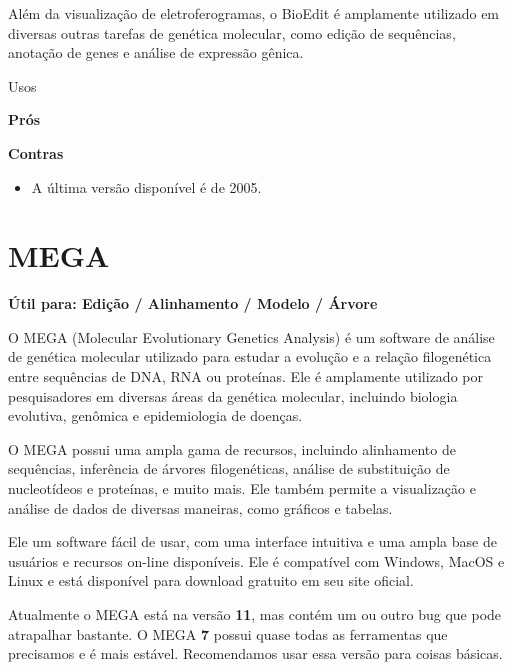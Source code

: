 \documentclass[
  letterpaper,
  DIV=11,
  numbers=noendperiod]{scrreprt}
\providecommand{\tightlist}{%
  \setlength{\itemsep}{0pt}\setlength{\parskip}{0pt}}\usepackage{longtable,booktabs,array}
\begin{document}
Além da visualização de eletroferogramas, o BioEdit é amplamente
utilizado em diversas outras tarefas de genética molecular, como edição
de sequências, anotação de genes e análise de expressão gênica.

Usos

\textbf{Prós}

\textbf{Contras}

\begin{itemize}
\tightlist
\item
  A última versão disponível é de 2005.
\end{itemize}

\hypertarget{mega}{%
\section{MEGA}\label{mega}}

\textbf{Útil para: {Edição} / {Alinhamento} / {Modelo} / {Árvore}}

O MEGA (Molecular Evolutionary Genetics Analysis) é um software de
análise de genética molecular utilizado para estudar a evolução e a
relação filogenética entre sequências de DNA, RNA ou proteínas. Ele é
amplamente utilizado por pesquisadores em diversas áreas da genética
molecular, incluindo biologia evolutiva, genômica e epidemiologia de
doenças.

O MEGA possui uma ampla gama de recursos, incluindo alinhamento de
sequências, inferência de árvores filogenéticas, análise de substituição
de nucleotídeos e proteínas, e muito mais. Ele também permite a
visualização e análise de dados de diversas maneiras, como gráficos e
tabelas.

Ele um software fácil de usar, com uma interface intuitiva e uma ampla
base de usuários e recursos on-line disponíveis. Ele é compatível com
Windows, MacOS e Linux e está disponível para download gratuito em seu
site oficial.

\begin{tcolorbox}[enhanced jigsaw, colbacktitle=quarto-callout-warning-color!10!white, toprule=.15mm, rightrule=.15mm, opacityback=0, left=2mm, arc=.35mm, breakable, colback=white, bottomtitle=1mm, opacitybacktitle=0.6, toptitle=1mm, leftrule=.75mm, coltitle=black, titlerule=0mm, bottomrule=.15mm, title=\textcolor{quarto-callout-warning-color}{\faExclamationTriangle}\hspace{0.5em}{Aviso}]

Atualmente o MEGA está na versão \textbf{11}, mas contém um ou outro bug
que pode atrapalhar bastante. O MEGA \textbf{7} possui quase todas as
ferramentas que precisamos e é mais estável. Recomendamos usar essa
versão para coisas básicas.

\end{tcolorbox}
\end{document}
